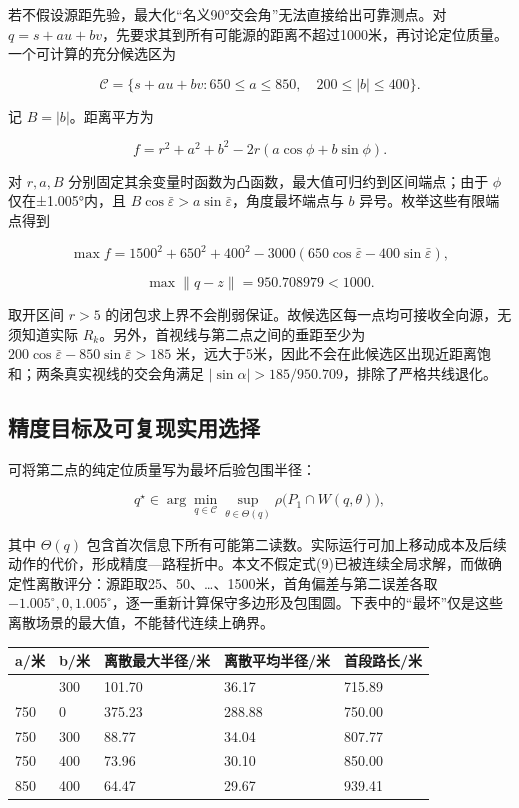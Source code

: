 \documentclass[
  chinese,
  UTF8,
  a4paper,
  zihao=-4]{ctexart}
\begin{document}
若不假设源距先验，最大化``名义90°交会角''无法直接给出可靠测点。对
\(q=s+au+bv\)，先要求其到所有可能源的距离不超过1000米，再讨论定位质量。一个可计算的充分候选区为

\[\mathcal C=\{s+au+bv:650\le a\le850,\quad200\le|b|\le400\}. \tag{7}\]

记 \(B=|b|\)。距离平方为

\[f=r^2+a^2+b^2-2r(a\cos\phi+b\sin\phi).\]

对 \(r,a,B\)
分别固定其余变量时函数为凸函数，最大值可归约到区间端点；由于 \(\phi\)
仅在±1.005°内，且
\(B\cos\bar\varepsilon>a\sin\bar\varepsilon\)，角度最坏端点与 \(b\)
异号。枚举这些有限端点得到

\[
\max f=1500^2+650^2+400^2-3000(650\cos\bar\varepsilon-400\sin\bar\varepsilon),
\]

\[\max\|q-z\|=950.708979<1000. \tag{8}\]

取开区间 \(r>5\)
的闭包求上界不会削弱保证。故候选区每一点均可接收全向源，无须知道实际
\(R_k\)。另外，首视线与第二点之间的垂距至少为
\(200\cos\bar\varepsilon-850\sin\bar\varepsilon>185\)
米，远大于5米，因此不会在此候选区出现近距离饱和；两条真实视线的交会角满足
\(|\sin\alpha|>185/950.709\)，排除了严格共线退化。

\subsection{精度目标及可复现实用选择}\label{ux7cbeux5ea6ux76eeux6807ux53caux53efux590dux73b0ux5b9eux7528ux9009ux62e9}

可将第二点的纯定位质量写为最坏后验包围半径：

\[
q^\star\in\arg\min_{q\in\mathcal C}\sup_{\theta\in\Theta(q)}
\rho\big(P_1\cap W(q,\theta)\big), \tag{9}
\]

其中 \(\Theta(q)\)
包含首次信息下所有可能第二读数。实际运行可加上移动成本及后续动作的代价，形成精度---路程折中。本文不假定式(9)已被连续全局求解，而做确定性离散评分：源距取25、50、\ldots、1500米，首角偏差与第二误差各取
\(-1.005^\circ,0,1.005^\circ\)，逐一重新计算保守多边形及包围圆。下表中的``最坏''仅是这些离散场景的最大值，不能替代连续上确界。

\begin{longtable}[]{@{}lllll@{}}
\toprule\noalign{}
a/米 & b/米 & 离散最大半径/米 & 离散平均半径/米 & 首段路长/米 \\
\midrule\noalign{}
\endhead
\bottomrule\noalign{}
\endlastfoot
650 & 300 & 101.70 & 36.17 & 715.89 \\
750 & 0 & 375.23 & 288.88 & 750.00 \\
750 & 300 & 88.77 & 34.04 & 807.77 \\
750 & 400 & 73.96 & 30.10 & 850.00 \\
850 & 400 & 64.47 & 29.67 & 939.41 \\
\end{longtable}
\end{document}
